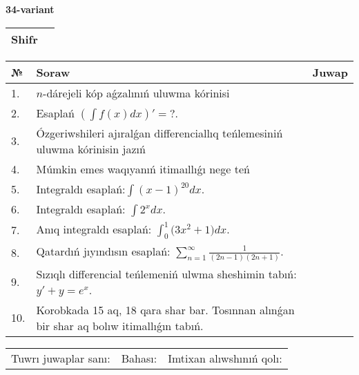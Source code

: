 \documentclass{article}
\begin{document}
  \egroup
  
  \newpage
  
  
  \textbf{34-variant}\\
  
  \bgroup
  \def\arraystretch{1.6} %
  
  \begin{tabular}{|m{5.7cm}|m{9.5cm}|}
  \hline
  Shifr & \\
  \hline
  \end{tabular}
  
  \vspace{1cm}
  
  \begin{tabular}{|m{0.7cm}|m{10cm}|m{4cm}|}
  \hline
  № & Soraw & Juwap \\
  \hline
  1. & \(n\)-dárejeli kóp aǵzalınıń uluwma kórinisi &  \\
  \hline
  2. & Esaplań \(\left( \int{f(x)dx} \right)' = ?\). &  \\
  \hline
  3. & Ózgeriwshileri ajıralǵan differenciallıq teńlemesiniń uluwma kórinisin jazıń &  \\
  \hline
  4. & Múmkin emes waqıyanıń itimaıllıǵı nege teń &  \\
  \hline
  5. & Integraldı esaplań:\(\int{(x - 1)^{20}}dx\). &  \\
  \hline
  6. & Integraldı esaplań: \(\int{2^{x}dx}\). &  \\
  \hline
  7. & Anıq integraldı esaplań: \(\int_{0}^{1}{(3x^2 } + 1)dx\). &  \\
  \hline
  8. & Qatardıń jıyındısın esaplań: \(\sum_{n = 1}^{\infty}\frac{1}{(2n - 1)(2n + 1)}\). &  \\
  \hline
  9. & Sızıqlı differencial teńlemeniń ulwma sheshimin tabıń: \(y' + y = e^{x}\). &  \\
  \hline
  10. & Korobkada 15 aq, 18 qara shar bar. Tosınnan alınǵan bir shar aq bolıw itimallıǵın tabıń. &  \\
  \hline
  \end{tabular}
  
  \vspace{1cm}
  
  \begin{tabular}{lll}
  Tuwrı juwaplar sanı: \underline{\hspace{1.5cm}} & 
  Bahası: \underline{\hspace{1.5cm}} & 
  Imtixan alıwshınıń qolı: \underline{\hspace{2cm}} \\
  \end{tabular}
  
\end{document}
